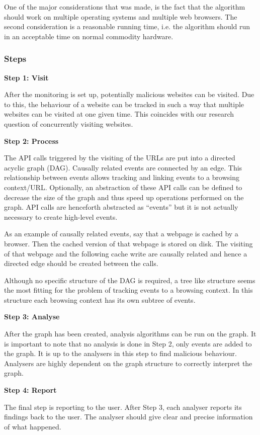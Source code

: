 One of the major considerations that was made, is the fact that the algorithm should work on multiple operating systems and multiple web browsers. The second consideration is a reasonable running time, i.e. the algorithm should run in an acceptable time on normal commodity hardware.

\subsubsection{Steps}

\textbf{Step 1: Visit}

After the monitoring is set up, potentially malicious websites can be visited. Due to this, the behaviour of a website can be tracked in such a way that multiple websites can be visited at one given time. This coincides with our research question of concurrently visiting websites.

\textbf{Step 2: Process}
\label{sec:algos2}

The API calls triggered by the visiting of the URLs are put into a directed acyclic graph (DAG). Causally related events are connected by an edge. This relationship between events allows tracking and linking events to a browsing context/URL. Optionally, an abstraction of these API calls can be defined to decrease the size of the graph and thus speed up operations performed on the graph. API calls are henceforth abstracted as ``events'' but it is not actually necessary to create high-level events.

As an example of causally related events, say that a webpage is cached by a browser. Then the cached version of that webpage is stored on disk. The visiting of that webpage and the following cache write are causally related and hence a directed edge should be created between the calls.

Although no specific structure of the DAG is required, a tree like structure seems the most fitting for the problem of tracking events to a browsing context. In this structure each browsing context has its own subtree of events. 

\textbf{Step 3: Analyse}

After the graph has been created, analysis algorithms can be run on the graph. It is important to note that no analysis is done in Step 2, only events are added to the graph. It is up to the analysers in this step to find malicious behaviour. Analysers are highly dependent on the graph structure to correctly interpret the graph.

\textbf{Step 4: Report}

The final step is reporting to the user. After Step 3, each analyser reports its findings back to the user. The analyser should give clear and precise information of what happened.
